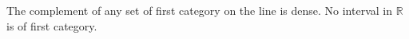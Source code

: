 The complement of any set of first category on the line is dense. No interval in $\mathbb{R}$ is of first category.
